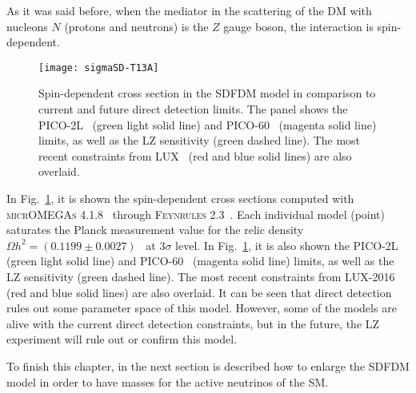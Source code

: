 As it was said before, when the mediator in the scattering of the DM with nucleons $N$ (protons and neutrons) 
is the $Z$ gauge boson, the interaction is spin-dependent.
%
\begin{figure}[h]
\begin{center}
\texttt{[image: sigmaSD-T13A]} 
\caption{Spin-dependent cross section in the SDFDM model in comparison to current and future direct detection limits. 
The panel shows the PICO-2L~\cite{Amole:2016pye} (green light solid line) and PICO-60~\cite{Amole:2015pla} (magenta solid line) limits, as well as the LZ sensitivity (green dashed line). The most recent constraints from LUX~\cite{Akerib:2016lao} (red and blue solid lines) are also overlaid. 
}
\label{fig:sigma-SD}
\end{center}
\end{figure}
%
In Fig.~\ref{fig:sigma-SD}, it is shown the spin-dependent cross sections computed with \textsc{micrOMEGAs 4.1.8}~\cite{Belanger:2014vza} through \textsc{Feynrules 2.3}~\cite{Christensen:2008py}. Each individual model (point) saturates the Planck measurement value for the relic density $\Omega h^2=(0.1199\pm0.0027)$~\cite{Ade:2013zuv} at $3\sigma$ level. 
In Fig.~\ref{fig:sigma-SD}, it is also shown the PICO-2L~\cite{Amole:2016pye} (green light solid line) and PICO-60~\cite{Amole:2015pla} (magenta solid line) limits, as well as the LZ sensitivity (green dashed line). The most recent constraints from LUX-2016~\cite{Akerib:2016lao} (red and blue solid lines) are also overlaid. 
It can be seen that direct detection rules out some parameter space of this model. However, some of the models are alive with the current direct detection constraints, but in the future, the LZ experiment will rule out or confirm this model.

To finish this chapter, in the next section is described how to enlarge the SDFDM model in order to have masses for the active neutrinos of the SM.








